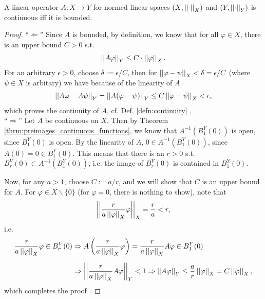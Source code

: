\begin{theorem}\label{thrm:continuous-operator-bounded}
	A linear operator $A:X\to Y$ for normed linear spaces $\left(X, \left\vert\left\vert \cdot \right\vert\right\vert_{X}\right)$ and $\left( Y, \left\vert\left\vert \cdot \right\vert\right\vert_{Y}\right)$ is continuous iff it is bounded.
\end{theorem}

\begin{proof}
	\enquote{$\Longleftarrow$} Since $A$ is bounded, by definition, we know that for all $\varphi\in X$, there is an upper bound $C > 0$ s.t. 
	\begin{align}
		\left\vert\left\vert A\varphi \right\vert\right\vert_{Y} \leq C\cdot \left\vert\left\vert \varphi \right\vert\right\vert_{X}.
	\end{align}
	For an arbitrary $\epsilon > 0$, choose $\delta := \epsilon/C$, then for $\left\vert\left\vert \varphi - \psi \right\vert\right\vert_{X} < \delta = \epsilon/C$ (where $\psi\in X$ is arbitary) we have because of the linearity of $A$
	\begin{align}
		\left\vert\left\vert A\varphi - A\psi \right\vert\right\vert_{Y} = \left\vert\left\vert A(\varphi - \psi) \right\vert\right\vert_{Y} \leq C\left\vert\left\vert \varphi - \psi \right\vert\right\vert_{X} < \epsilon,
	\end{align}
	which proves the continuity of $A$, cf. Def. \ref{defn:continuity} \cite{556667}.
	\\
	
	\enquote{$\Longrightarrow$} Let $A$ be continuous on $X$. Then by Theorem \ref{thrm:preimages_continuous_functions}, we know that $A^{-1}\left(B^{Y}_1(0)\right)$ is open, since $B^{Y}_{1}(0)$ is open. By the linearity of $A$, $0\in A^{-1}\left(B^{Y}_1(0)\right)$, since \\ $A(0) = 0 \in B_1^{Y}(0)$. This means that there is an $r > 0$ s.t. $B^{V}_{r}(0) \subset A^{-1}\left(B^{Y}_1(0)\right)$, i.e. the image of $B^{V}_{r}(0)$ is contained in $B^{Y}_{1}(0)$.
	
	Now, for any $a > 1$, choose $C := a/r$, and we will show that $C$ is an upper bound for $A$. For $\varphi\in X\backslash \{0\}$ (for $\varphi =0$, there is nothing to show), note that $$\left\vert\left\vert \frac{r}{a\left\vert\left\vert \varphi \right\vert\right\vert_{X}}\varphi \right\vert\right\vert_{X} = \frac{r}{a} < r,$$ i.e. 
	\begin{align}
		\frac{r}{a\left\vert\left\vert \varphi \right\vert\right\vert_{X}}\varphi \in B_{r}^{V}(0) &\Rightarrow A\left(\frac{r}{a\left\vert\left\vert \varphi \right\vert\right\vert_{X}}\varphi\right) = \frac{r}{a\left\vert\left\vert \varphi \right\vert\right\vert_{X}}A\varphi\in B^{Y}_{1}(0) 
		\\[6pt] &\Rightarrow \left\vert\left\vert \frac{r}{a\left\vert\left\vert \varphi \right\vert\right\vert_{X}}A\varphi \right\vert\right\vert_{Y} < 1 \Rightarrow \left\vert\left\vert A\varphi \right\vert\right\vert_{Y} \leq \frac{a}{r}\left\vert\left\vert \varphi \right\vert\right\vert_{X} = C\left\vert\left\vert \varphi \right\vert\right\vert_{X},
	\end{align}
	which completes the proof \cite[p. 2]{src:mit_lec}.
\end{proof}